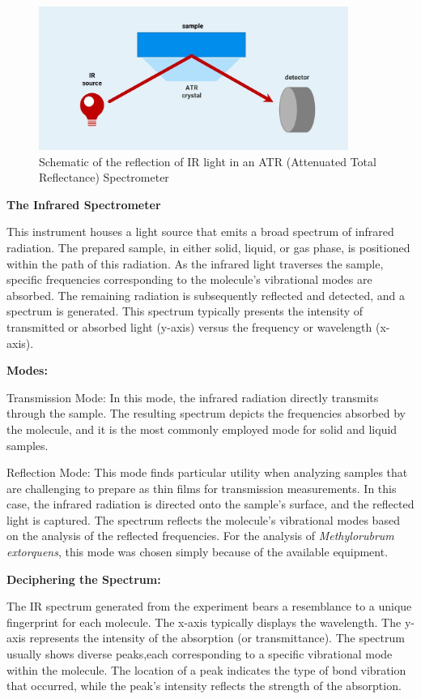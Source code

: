 \begin{figure}[H]
    \centering
    \includegraphics[width=0.9\textwidth]{./media/images/ir_spectrometer}
    \caption{Schematic of the reflection of IR light in an ATR (Attenuated Total Reflectance) Spectrometer}
    \label{fig:ir_spectrometer}
\end{figure}

\textbf{The Infrared Spectrometer}

This instrument houses a light source that emits a broad spectrum of infrared radiation.
The prepared sample, in either solid, liquid, or gas phase, is positioned within the path of this radiation.
As the infrared light traverses the sample, specific frequencies corresponding to the molecule's vibrational modes are absorbed.
The remaining radiation is subsequently reflected and detected, and a spectrum is generated.
This spectrum typically presents the intensity of transmitted or absorbed light (y-axis) versus the frequency or wavelength (x-axis).

\textbf{Modes:}

Transmission Mode: In this mode, the infrared radiation directly transmits through the sample.
The resulting spectrum depicts the frequencies absorbed by the molecule, and it is the most commonly employed mode for solid and liquid samples.

Reflection Mode: This mode finds particular utility when analyzing samples that are challenging to prepare as thin films for transmission measurements.
In this case, the infrared radiation is directed onto the sample's surface, and the reflected light is captured.
The spectrum reflects the molecule's vibrational modes based on the analysis of the reflected frequencies.
For the analysis of \emph{Methylorubrum extorquens}, this mode was chosen simply because of the available equipment.

\textbf{Deciphering the Spectrum:}

The IR spectrum generated from the experiment bears a resemblance to a unique fingerprint for each molecule.
The x-axis typically displays the wavelength.
The y-axis represents the intensity of the absorption (or transmittance).
The spectrum usually shows diverse peaks,each corresponding to a specific vibrational mode within the molecule.
The location of a peak indicates the type of bond vibration that occurred, while the peak's intensity reflects the strength of the absorption.


